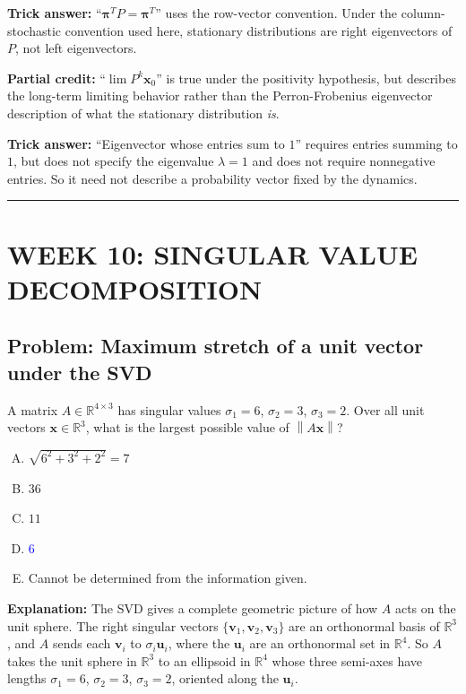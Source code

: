 \documentclass[12pt]{amsart}
\newcommand{\divider}{
  \vspace{-1em}
  \noindent
  \raisebox{-0.15ex}{\textbullet}%
  \hspace{0.5em}%
  \rule[0.5ex]{0.95\textwidth}{1.0pt}%
  \hspace{0.5em}%
  \raisebox{-0.15ex}{\textbullet}%
  \vspace{0em}
}
\newcommand{\norm}[1]{\left\|#1\right\|}
\begin{document}
\textbf{Trick answer:}
``$\boldsymbol{\pi}^T P = \boldsymbol{\pi}^T$'' uses the row-vector
convention. Under the column-stochastic convention used here, stationary
distributions are right eigenvectors of $P$, not left eigenvectors.

\textbf{Partial credit:}
``$\lim P^k \mathbf{x}_0$'' is true under the positivity hypothesis, but
describes the long-term limiting behavior rather than the Perron-Frobenius
eigenvector description of what the stationary distribution \emph{is}.

\textbf{Trick answer:}
``Eigenvector whose entries sum to $1$'' requires entries summing to $1$,
but does not specify the eigenvalue $\lambda = 1$ and does not require
nonnegative entries. So it need not describe a probability vector fixed
by the dynamics.

\divider

\section*{WEEK 10: SINGULAR VALUE DECOMPOSITION}

\subsection*{Problem: Maximum stretch of a unit vector under the SVD}

A matrix $A \in \mathbb{R}^{4 \times 3}$ has singular values $\sigma_1 = 6$,
$\sigma_2 = 3$, $\sigma_3 = 2$. Over all unit vectors
$\mathbf{x} \in \mathbb{R}^3$, what is the largest possible value of
$\norm{A\mathbf{x}}$?

\begin{enumerate}[(A)]
\item $\sqrt{6^2 + 3^2 + 2^2} = 7$
\item $36$
\item $11$
\item \textcolor{blue}{\textbf{$6$}}
\item Cannot be determined from the information given.
\end{enumerate}

\textbf{Explanation:}
The SVD gives a complete geometric picture of how $A$ acts on the unit sphere.
The right singular vectors $\{\mathbf{v}_1, \mathbf{v}_2, \mathbf{v}_3\}$ are
an orthonormal basis of $\mathbb{R}^3$, and $A$ sends each $\mathbf{v}_i$
to $\sigma_i \mathbf{u}_i$, where the $\mathbf{u}_i$ are an orthonormal set
in $\mathbb{R}^4$. So $A$ takes the unit sphere in $\mathbb{R}^3$ to an
ellipsoid in $\mathbb{R}^4$ whose three semi-axes have lengths
$\sigma_1 = 6$, $\sigma_2 = 3$, $\sigma_3 = 2$, oriented along the
$\mathbf{u}_i$.
\end{document}
